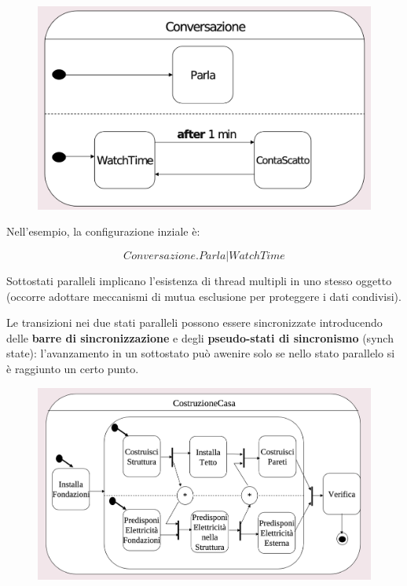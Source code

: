 \begin{figure}[H]
    \centering
    \includegraphics[width=0.75\linewidth]{assets/UML/state/state8.png}
\end{figure}

Nell'esempio, la configurazione inziale è:

$$Conversazione.Parla|WatchTime$$ 

Sottostati paralleli implicano l'esistenza di thread multipli in uno stesso oggetto (occorre adottare meccanismi di mutua esclusione per proteggere i dati condivisi).

Le transizioni nei due stati paralleli possono essere sincronizzate introducendo delle \textbf{barre di sincronizzazione} e degli \textbf{pseudo-stati di sincronismo} (synch state): l'avanzamento in un sottostato può awenire solo se nello stato parallelo si è raggiunto un certo punto.

\begin{figure}[H]
    \centering
    \includegraphics[width=0.75\linewidth]{assets/UML/state/state9.png}
\end{figure}

\newpage